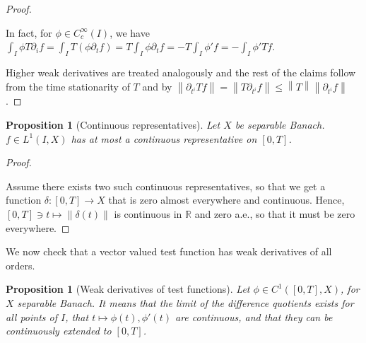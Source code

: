 \documentclass[english,a4paper,9pt,oneside]{scrbook}	%
\theoremstyle{break}
\newtheorem{prop}[equation]{Proposition}
\newenvironment{mproof}[1][\proofname]{%
  \begin{proof}[#1]$ $\par\nobreak\ignorespaces
}{%
  \end{proof}
}
\renewcommand*{\proofname}{Proof}
\theoremstyle{remark}
\newcommand{\mR}{\mathbb{R}}
\newcommand{\norm}[1]{\left\lVert#1\right\rVert}
\newcommand{\emb}{\hookrightarrow}
\begin{document}
\begin{appendices}
\begin{mproof}
In fact, for $\phi \in C_c^\infty(I)$, we have $\int_I \phi T\partial_i f = \int_I T(\phi\partial_t f) = T \int_I\phi\partial_t f = -T\int_I\phi'f=-\int_I\phi'Tf$.

Higher weak derivatives are treated analogously and the rest of the claims follow from the time stationarity of $T$ and by $\norm{\partial_{t^i}Tf}=\norm{T\partial_{t^i}f}\leq \norm{T}\norm{\partial_{t^i}f}$.

\end{mproof}

\begin{prop}[Continuous representatives]
\label{prop:cts_repr}
Let $X$ be separable Banach. $f \in L^1(I,X)$ has at most a continuous representative on $[0,T]$.
\end{prop}
\begin{mproof}
Assume there exists two such continuous representatives, so that we get a function $\delta: [0,T] \rightarrow X$ that is zero almost everywhere and continuous. Hence, $[0,T] \ni t \mapsto \norm{\delta(t)}$ is continuous in $\mR$ and zero a.e., so that it must be zero everywhere.
\end{mproof}

%
%
%

We now check that a vector valued test function has weak derivatives of all orders.

\begin{prop}[Weak derivatives of test functions]
\label{prop:weak_class}
Let $\phi \in C^1([0,T],X)$, for $X$ separable Banach. It means that the limit of the difference quotients exists for all points of $I$, that $t\mapsto \phi(t), \phi'(t)$ are continuous, and that they can be continuously extended to $[0,T]$.


\end{prop}
\end{appendices}
\end{document}
